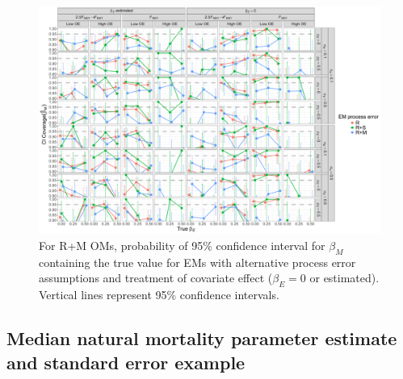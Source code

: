 \documentclass[
  12pt,
]{article}
\begin{document}
\begin{landscape}
\begin{figure}
\begin{center}
\includegraphics[height = \textheight]{beta_M_CI_coverage_RMom}
\end{center}
\caption{For R+M OMs, probability of 95\% confidence interval for $\beta_M$ containing the true value for EMs with alternative process error assumptions and treatment of covariate effect ($\beta_E = 0$ or estimated). Vertical lines represent 95\% confidence intervals.}\label{beta_M_CI_coverage_RMom}
\end{figure}
\end{landscape}

\hypertarget{median-natural-mortality-parameter-estimate-and-standard-error-example}{%
\subsection*{Median natural mortality parameter estimate and standard error example}\label{median-natural-mortality-parameter-estimate-and-standard-error-example}}
\end{document}

